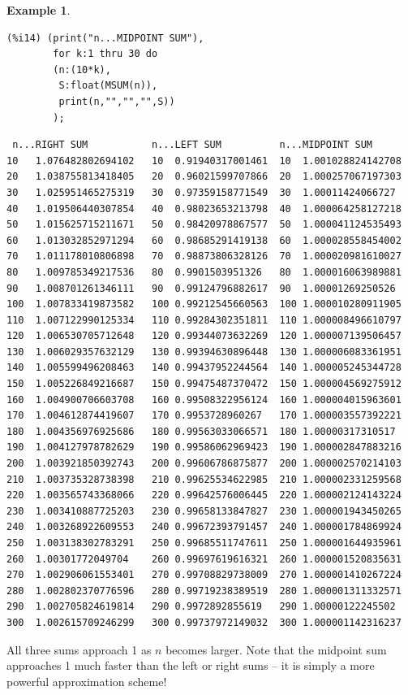 \documentclass[10.5pt,twoside]{report}
\theoremstyle{definition}
\newtheorem{exmp}{Example}[section]
\begin{document}
\begin{exmp}
\begin{verbatim}
(%i14) (print("n...MIDPOINT SUM"),
        for k:1 thru 30 do
        (n:(10*k),
         S:float(MSUM(n)),
         print(n,"","","",S))
        );          
\end{verbatim}        
\pagebreak
\begin{verbatim}       
 n...RIGHT SUM           n...LEFT SUM          n...MIDPOINT SUM
10   1.076482802694102   10  0.91940317001461  10  1.001028824142708
20   1.038755813418405   20  0.96021599707866  20  1.000257067197303
30   1.025951465275319   30  0.97359158771549  30  1.00011424066727
40   1.019506440307854   40  0.98023653213798  40  1.000064258127218
50   1.015625715211671   50  0.98420978867577  50  1.000041124535493
60   1.013032852971294   60  0.98685291419138  60  1.000028558454002
70   1.011178010806898   70  0.98873806328126  70  1.000020981610027
80   1.009785349217536   80  0.9901503951326   80  1.000016063989881
90   1.008701261346111   90  0.99124796882617  90  1.00001269250526
100  1.007833419873582   100 0.99212545660563  100 1.000010280911905
110  1.007122990125334   110 0.99284302351811  110 1.000008496610797
120  1.006530705712648   120 0.99344073632269  120 1.000007139506457
130  1.006029357632129   130 0.99394630896448  130 1.000006083361951
140  1.005599496208463   140 0.99437952244564  140 1.000005245344728
150  1.005226849216687   150 0.99475487370472  150 1.000004569275912
160  1.004900706603708   160 0.99508322956124  160 1.000004015963601
170  1.004612874419607   170 0.9953728960267   170 1.000003557392221
180  1.004356976925686   180 0.99563033066571  180 1.00000317310517
190  1.004127978782629   190 0.99586062969423  190 1.000002847883216
200  1.003921850392743   200 0.99606786875877  200 1.000002570214103
210  1.003735328738398   210 0.99625534622985  210 1.000002331259568
220  1.003565743368066   220 0.99642576006445  220 1.000002124143224
230  1.003410887725203   230 0.99658133847827  230 1.000001943450265
240  1.003268922609553   240 0.99672393791457  240 1.000001784869924
250  1.003138302783291   250 0.99685511747611  250 1.000001644935961
260  1.00301772049704    260 0.99697619616321  260 1.000001520835631
270  1.002906061553401   270 0.99708829738009  270 1.000001410267224
280  1.002802370776596   280 0.99719238389519  280 1.000001311332571
290  1.002705824619814   290 0.9972892855619   290 1.00000122245502
300  1.002615709246299   300 0.99737972149032  300 1.000001142316237           
\end{verbatim}

All three sums approach 1 as $n$ becomes larger.  Note that the midpoint sum approaches 1 much faster than the left or right sums -- it is simply a more powerful approximation scheme!  \\


\end{exmp}
\end{document}
